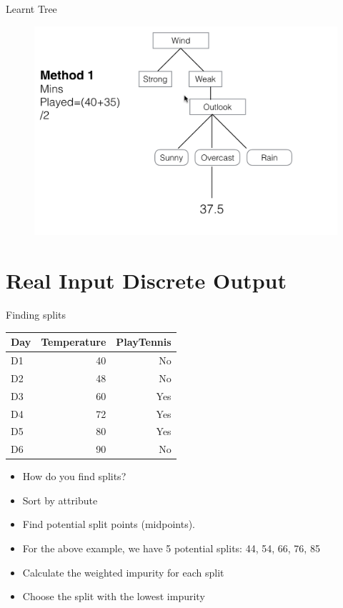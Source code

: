 \documentclass[usenames,dvipsnames]{beamer}
\begin{document}
\begin{frame}{Learnt Tree}
\begin{figure}
	\centering
	\includegraphics[width=1\linewidth]{../assets/decision-trees/diagrams/tree2}

	\label{fig:tree}
\end{figure}

\end{frame}

\section{Real Input Discrete Output}


\begin{frame}{Finding splits}
\begin{table}[]
	\begin{tabular}{@{}lrr@{}}
		\toprule
		\textbf{Day} & \textbf{Temperature} & \textbf{PlayTennis} \\ \midrule
		D1           & 40                   & No                  \\
		D2           & 48                   & No                  \\
		D3           & 60                   & Yes                 \\
		D4           & 72                   & Yes                 \\
		D5           & 80                   & Yes                 \\
		D6           & 90                   & No                  \\ \bottomrule
	\end{tabular}
\end{table}
\begin{itemize}[<+->]
	\item How do you find splits?
	\item Sort by attribute
	\item Find potential split points (midpoints). 
	\item For the above example, we have 5 potential splits: 44, 54, 66, 76, 85
	\item Calculate the weighted impurity for each split
	\item Choose the split with the lowest impurity
\end{itemize}
\end{frame}
\end{document}
